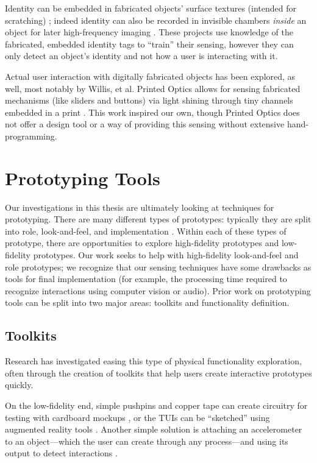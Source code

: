         Identity can be embedded in fabricated objects' surface textures (intended for scratching) \cite{harrison-acoustic}; indeed identity can also be recorded in invisible chambers \emph{inside} an object for later high-frequency imaging \cite{willis-infrastructs}. These projects use knowledge of the fabricated, embedded identity tags to ``train'' their sensing, however they can only detect an object's identity and not how a user is interacting with it.

        Actual user interaction with digitally fabricated objects has been explored, as well, most notably by Willis, et al. Printed Optics allows for sensing fabricated mechanisms (like sliders and buttons) via light shining through tiny channels embedded in a print \cite{willis-printedoptics}. This work inspired our own, though Printed Optics does not offer a design tool or a way of providing this sensing without extensive hand-programming.

\section{Prototyping Tools}

    Our investigations in this thesis are ultimately looking at techniques for prototyping. There are many different types of prototypes: typically they are split into role, look-and-feel, and implementation \cite{houde-prototypes}. Within each of these types of prototype, there are opportunities to explore high-fidelity prototypes and low-fidelity prototypes. Our work seeks to help with high-fidelity look-and-feel and role prototypes; we recognize that our sensing techniques have some drawbacks as tools for final implementation (for example, the processing time required to recognize interactions using computer vision or audio). Prior work on prototyping tools can be split into two major areas: toolkits and functionality definition.

    \subsection{Toolkits}
    Research has investigated easing this type of physical functionality exploration, often through the creation of toolkits that help users create interactive prototypes quickly.
    
    On the low-fidelity end, simple pushpins and copper tape can create circuitry for testing with cardboard mockups \cite{hudson-boxes}, or the TUIs can be ``sketched'' using augmented reality tools \cite{nam-sketchingtuis}. Another simple solution is attaching an accelerometer to an object---which the user can create through any process---and using its output to detect interactions \cite{hook-making}.
    
